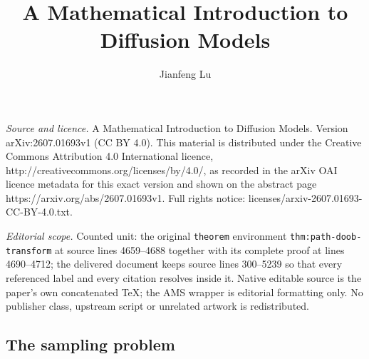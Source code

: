 \documentclass[10pt,a4paper]{amsart}
\numberwithin{equation}{section}
\begin{document}
\title[A Mathematical Introduction to Diffusion Models]{A Mathematical Introduction to Diffusion Models}
\author{Jianfeng Lu}
\date{}
\maketitle
\noindent\emph{Source and licence.} A Mathematical Introduction to Diffusion Models. Version arXiv:2607.01693v1 (CC BY 4.0). This material is distributed under the Creative Commons Attribution 4.0 International licence, http://creativecommons.org/licenses/by/4.0/, as recorded in the arXiv OAI licence metadata for this exact version and shown on the abstract page https://arxiv.org/abs/2607.01693v1. Full rights notice: licenses/arxiv-2607.01693-CC-BY-4.0.txt.\par\smallskip
\noindent\textit{Editorial scope.} Counted unit: the original \texttt{theorem} environment \texttt{thm:path-doob-transform} at source lines 4659--4688 together with its complete proof at lines 4690--4712; the delivered document keeps source lines 300--5239 so that every referenced label and every citation resolves inside it. Native editable source is the paper's own concatenated TeX; the AMS wrapper is editorial formatting only. No publisher class, upstream script or unrelated artwork is redistributed.
\subsection{The sampling problem}\label{subsec:sampling-problem}
\end{document}
